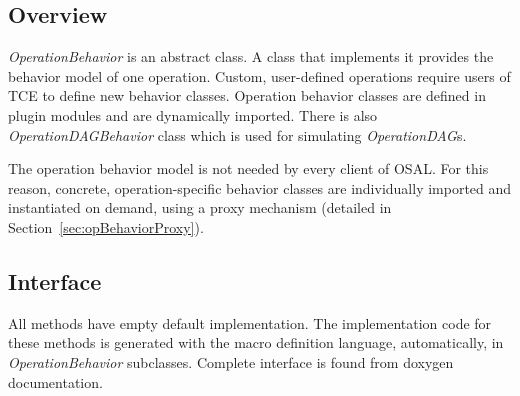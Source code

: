 \documentclass[a4paper,twoside]{tce}
\begin{document}
\subsection{Overview}

\emph{OperationBehavior} is an abstract class.  A class that implements it
provides the behavior model of one operation.  Custom, user-defined
operations require users of TCE to define new behavior classes.  Operation
behavior classes are defined in plugin modules and are dynamically
imported. There is also \emph{OperationDAGBehavior} class which is used for
simulating \emph{OperationDAG}s.

The operation behavior model is not needed by every client of OSAL. For this
reason, concrete, operation-specific behavior classes are individually
imported and instantiated on demand, using a proxy mechanism (detailed in
Section~\ref{sec:opBehaviorProxy}).

\subsection{Interface}

All methods  have empty default implementation.  The implementation code for 
these methods is generated with the macro definition language, automatically, 
in \emph{OperationBehavior} subclasses. Complete interface is found from 
doxygen documentation.
\end{document}
